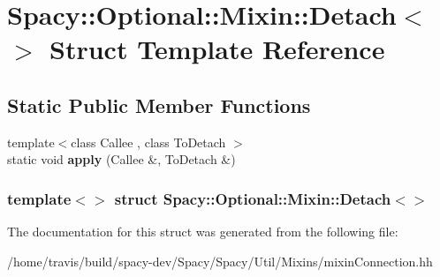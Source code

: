 \hypertarget{structSpacy_1_1Optional_1_1Mixin_1_1Detach_3_4}{\section{\-Spacy\-:\-:\-Optional\-:\-:\-Mixin\-:\-:\-Detach$<$$>$ \-Struct \-Template \-Reference}
\label{structSpacy_1_1Optional_1_1Mixin_1_1Detach_3_4}
}
\subsection*{\-Static \-Public \-Member \-Functions}
\begin{DoxyCompactItemize}
\item 
\hypertarget{structSpacy_1_1Optional_1_1Mixin_1_1Detach_3_4_a1ab6239f02532537e4b908bcc5cd77d1}{{\footnotesize template$<$class Callee , class To\-Detach $>$ }\\static void {\bfseries apply} (\-Callee \&, \-To\-Detach \&)}\label{structSpacy_1_1Optional_1_1Mixin_1_1Detach_3_4_a1ab6239f02532537e4b908bcc5cd77d1}

\end{DoxyCompactItemize}
\subsubsection*{template$<$$>$ struct Spacy\-::\-Optional\-::\-Mixin\-::\-Detach$<$$>$}



\-The documentation for this struct was generated from the following file\-:\begin{DoxyCompactItemize}
\item 
/home/travis/build/spacy-\/dev/\-Spacy/\-Spacy/\-Util/\-Mixins/mixin\-Connection.\-hh\end{DoxyCompactItemize}
